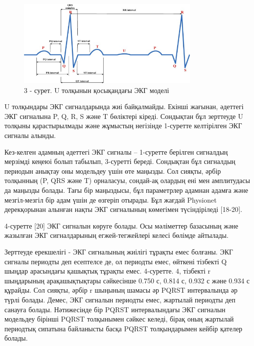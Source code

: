\begin{figure}[H]
	\centering
	\includegraphics[width=0.8\textwidth]{media/ict/image42}
	\caption*{3 - сурет. U толқынын қосықандағы ЭКГ моделі}
\end{figure}

\begin{multicols}{2}
U толқындары ЭКГ сигналдарында жиі байқалмайды. Екінші жағынан, әдеттегі
ЭКГ сигналына P, Q, R, S және T бөліктері кіреді. Сондықтан бұл
зерттеуде U толқыны қарастырылмады және жұмыстың негізінде 1-суретте
келтірілген ЭКГ сигналы алынды.

Кез-келген адамның әдеттегі ЭКГ сигналы -- 1-суретте берілген сигналдың
мерзімді кеңеюі болып табылып, 3-суретті береді. Сондықтан бұл сигналдың
периодын анықтау оны модельдеу үшін өте маңызды. Сол сияқты, әрбір
толқынның (P, QRS және T) орналасуы, сондай-ақ олардың ені мен
амплитудасы да маңызды болады. Тағы бір маңыздысы, бұл параметрлер
адамнан адамға және мезгіл-мезгіл бір адам үшін де өзгеріп отырады. Бұл
жағдай Physionet дерекқорынан алынған нақты ЭКГ сигналының көмегімен
түсіндіріледі {[}18-20{]}.

4-суретте {[}20{]} ЭКГ сигналын көруге болады. Осы мәліметтер базасының
және жазылған ЭКГ сигналдарының егжей-тегжейлері келесі бөлімде
айтылады.

Зерттеуде ерекшелігі - ЭКГ сигналының жиілігі тұрақты емес болғаны. ЭКГ
сигналы периодты деп есептелсе де, ол периодты емес, өйткені тізбекті Q
шыңдар арасындағы қашықтық тұрақты емес. 4-суретте. 4, тізбекті r
шыңдарының арақашықтықтары сәйкесінше 0.750 с, 0.814 с, 0.932 с және
0.934 с құрайды. Сол сияқты, әрбір r шыңының шамасы әр PQRST
интервалында әр түрлі болады. Демес, ЭКГ сигналын периодты емес,
жартылай периодты деп санауға болады. Нәтижесінде бір PQRST
интервалындағы ЭКГ сигналын модельдеу бірінші PQRST толқынымен сәйкес
келеді, бірақ оның жартылай периодтық сипатына байланысты басқа PQRST
толқындарымен кейбір қателер болады.
\end{multicols}

